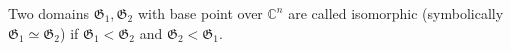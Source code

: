 Two domains $\mathfrak{G}_1, \mathfrak{G}_2$ with base point over $\mathbb{C}^n$ are called isomorphic (symbolically $\mathfrak{G}_1 \simeq \mathfrak{G}_2$) if $\mathfrak{G}_1 < \mathfrak{G}_2$ and $\mathfrak{G}_2 < \mathfrak{G}_1$.
